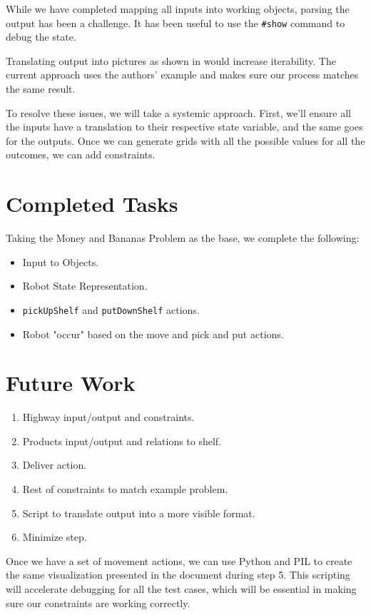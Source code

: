 \documentclass[letterpaper]{article} %
\begin{document}
While we have completed mapping all inputs into working objects, parsing the output has been a challenge. It has been useful to use the \texttt{\#show} command to debug the state.

Translating output into pictures as shown in \cite{cse579:AutomatedWarehouseScenario} would increase iterability.
The current approach uses the authors' example and makes sure our process matches the same result.

To resolve these issues, we will take a systemic approach. First, we'll ensure all the inputs have a translation to their respective state variable, and the same goes for the outputs. Once we can generate grids with all the possible values for all the outcomes, we can add constraints.

\section{Completed Tasks}

Taking the Money and Bananas Problem as the base, we complete the following:

\begin{itemize}
    \item Input to Objects.
    \item Robot State Representation.
    \item \texttt{pickUpShelf} and \texttt{putDownShelf} actions.
    \item Robot "occur" based on the move and pick and put actions.
\end{itemize}

\section{Future Work}

\begin{enumerate}
    \item Highway input/output and constraints.
    \item Products input/output and relations to shelf.
    \item Deliver action.
    \item Rest of constraints to match example problem.
    \item Script to translate output into a more visible format.
    \item Minimize step.
\end{enumerate}

Once we have a set of movement actions, we can use Python and PIL to create the same visualization presented in the document during step 5. This scripting will accelerate debugging for all the test cases, which will be essential in making sure our constraints are working correctly. 



\end{document}
